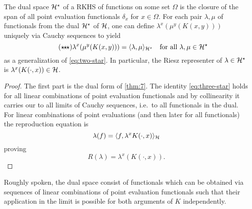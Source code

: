 \documentclass[../skript.tex]{subfiles}
\begin{document}
\begin{theorem} %
\label{thm:10}
The dual space $\mathcal{H}^\star$ of a \ac{RKHS} of functions on some set $\Omega$ is the closure of the span of all point evaluation functionals $\delta_x$ for $x \in \Omega$.
For each pair $\lambda, \mu$ of functionals from the dual $\mathcal{H}^\star$ of $\mathcal{H}$, one can define $\lambda^x(\mu^y(K(x, y)))$ uniquely via Cauchy sequences to yield
\begin{equation}
\label{eq:three-star}
\tag{$\star\!\!\star\!\!\star$}
	\lambda^x(\mu^y(K(x, y))) = \langle \lambda, \mu \rangle_{\mathcal{H}^\star} \quad \text{for all } \lambda, \mu \in \mathcal{H}^\star
\end{equation}
as a generalization of \cref{eq:two-star}.
In particular, the Riesz representer of $\lambda \in \mathcal{H}^\star$ is $\lambda^x(K(\cdot, x)) \in \mathcal{H}$.
\end{theorem}
\begin{proof}
The first part is the dual form of \cref{thm:7}.
The identity \cref{eq:three-star} holds for all linear combinations of point evaluation functionals and by collinearity it carries our to all limits of Cauchy sequences, i.e.\ to all functionals in the dual.
For linear combinations of point evaluations (and then later for all functionals) the reproduction equation is
\[
	\lambda(f) = \langle f, \lambda^x K(\cdot, x) \rangle_{\mathcal{H}}
\]
proving
\[
	R(\lambda) = \lambda^x(K(\cdot, x)).
\]
\end{proof}
Roughly spoken, the dual space consist of functionals which can be obtained via sequences of linear combinations of point evaluation functionals such that their application in the limit is possible for both arguments of $K$ independently.
\end{document}
